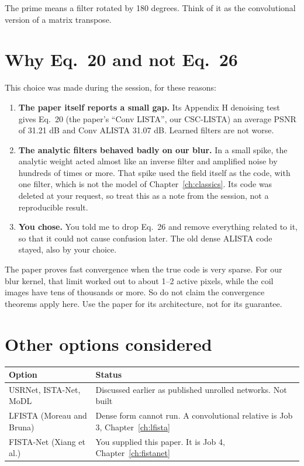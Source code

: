 The prime means a filter rotated by 180 degrees. Think of it as the convolutional version of a
matrix transpose.

\section{Why Eq.~20 and not Eq.~26}

This choice was made during the session, for these reasons:

\begin{enumerate}
\item \textbf{The paper itself reports a small gap.} Its Appendix H denoising test gives Eq.~20 (the paper's ``Conv LISTA'', our CSC-LISTA) an
average PSNR of 31.21 dB and Conv ALISTA 31.07 dB. Learned filters are not worse.
\item \textbf{The analytic filters behaved badly on our blur.} In a small spike, the analytic weight
acted almost like an inverse filter and amplified noise by hundreds of times or more. That spike used
the field itself as the code, with one filter, which is not the model of Chapter~\ref{ch:classics}. Its
code was deleted at your request, so treat this as a note from the session, not a reproducible result.
\item \textbf{You chose.} You told me to drop Eq.~26 and remove everything related to it, so that it
could not cause confusion later. The old dense ALISTA code stayed, also by your choice.
\end{enumerate}

\begin{careful}
The paper proves fast convergence when the true code is very sparse. For our blur kernel, that limit
worked out to about 1--2 active pixels, while the coil images have tens of thousands or more. So do not claim the
convergence theorems apply here. Use the paper for its architecture, not for its guarantee.
\end{careful}

\section{Other options considered}

\begin{center}
\begin{tabularx}{\textwidth}{lX}
\toprule
Option & Status \\
\midrule
USRNet, ISTA-Net, MoDL & Discussed earlier as published unrolled networks. Not built \\
LFISTA (Moreau and Bruna) & Dense form cannot run. A convolutional relative is Job 3,
Chapter~\ref{ch:lfista} \\
FISTA-Net (Xiang et al.) & You supplied this paper. It is Job 4, Chapter~\ref{ch:fistanet} \\
\bottomrule
\end{tabularx}
\end{center}

